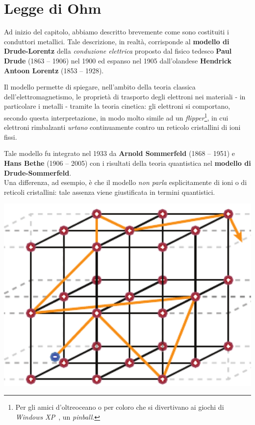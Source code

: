 \section{Legge di Ohm}
Ad inizio del capitolo, abbiamo descritto brevemente come sono costituiti i conduttori metallici. Tale descrizione, in realtà, corrisponde al \textbf{modello di Drude-Lorentz} della \textit{conduzione elettrica} proposto dal fisico tedesco \textbf{Paul Drude} (1863 – 1906) nel 1900 ed espanso nel 1905 dall'olandese \textbf{Hendrick Antoon Lorentz} (1853 – 1928).

Il modello permette di spiegare, nell'ambito della teoria classica dell'elettromagnetismo, le proprietà di trasporto degli elettroni nei materiali - in particolare i metalli - tramite la teoria cinetica: gli elettroni si comportano, secondo questa interpretazione, in modo molto simile ad un \textit{flipper}\footnote{Per gli amici d'oltreoceano o per coloro che si divertivano ai giochi di \textit{Windows XP}\texttrademark\ , un \textit{pinball}.}, in cui elettroni rimbalzanti \textit{urtano} continuamente contro un reticolo cristallini di ioni fissi.
\begin{digression}
	Tale modello fu integrato nel 1933 da \textbf{Arnold Sommerfeld} (1868 – 1951) e \textbf{Hans Bethe} (1906 – 2005) con i risultati della teoria quantistica nel \textbf{modello di Drude-Sommerfeld}.\\
	Una differenza, ad esempio, è che il modello \textit{non parla} esplicitamente di ioni o di reticoli cristallini: tale assenza viene giustificata in termini quantistici.
\end{digression}
\begin{minipage}{0.38\textwidth}
	\begin{center}
		\includegraphics[width=1\textwidth]{images/chp5/chp5reticolocristallino.pdf}
	\end{center}
\end{minipage}\hspace{5pt}
